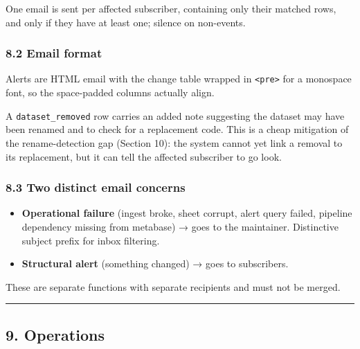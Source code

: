 \documentclass[
]{article}
\providecommand{\tightlist}{%
  \setlength{\itemsep}{0pt}\setlength{\parskip}{0pt}}
\begin{document}
One email is sent per affected subscriber, containing only their matched
rows, and only if they have at least one; silence on non-events.

\subsubsection{8.2 Email format}\label{email-format}

Alerts are HTML email with the change table wrapped in
\texttt{\textless{}pre\textgreater{}} for a monospace font, so the
space-padded columns actually align.

A \texttt{dataset\_removed} row carries an added note suggesting the
dataset may have been renamed and to check for a replacement code. This
is a cheap mitigation of the rename-detection gap (Section 10): the
system cannot yet link a removal to its replacement, but it can tell the
affected subscriber to go look.

\subsubsection{8.3 Two distinct email
concerns}\label{two-distinct-email-concerns}

\begin{itemize}
\tightlist
\item
  \textbf{Operational failure} (ingest broke, sheet corrupt, alert query
  failed, pipeline dependency missing from metabase) → goes to the
  maintainer. Distinctive subject prefix for inbox filtering.
\item
  \textbf{Structural alert} (something changed) → goes to subscribers.
\end{itemize}

These are separate functions with separate recipients and must not be
merged.

\begin{center}\rule{0.5\linewidth}{0.5pt}\end{center}

\subsection{9. Operations}\label{operations}
\end{document}
